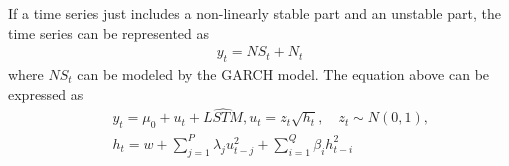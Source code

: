 If a time series just includes a non-linearly stable part and an unstable part, the time series can be represented as
\begin{eqnarray}
     y_t = NS_t +  N_t
\end{eqnarray}
where $NS_t$ can be modeled by the GARCH model. The equation above can be expressed as
\begin{eqnarray}
&& y_t = \mu_0 + u_t + \widehat{LSTM}, u_t = z_t{\sqrt{h_t}},\quad z_t\sim N(0,1),\nonumber \\
&& h_t = w+\sum_{j=1}^{P} {\lambda_j{u_{t-j}^2}}+\sum_{i=1}^{Q}{\beta_i{h_{t-i}^2}} 
\end{eqnarray}








